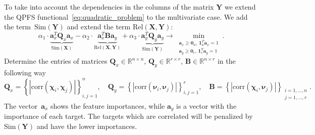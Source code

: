 \documentclass[12pt,twoside]{article}
\newcommand{\ba}{\mathbf{a}}
\newcommand{\bY}{\mathbf{Y}}
\newcommand{\bX}{\mathbf{X}}
\newcommand{\bB}{\mathbf{B}}
\newcommand{\bQ}{\mathbf{Q}}
\newcommand{\bbR}{\mathbb{R}}
\newcommand{\bchi}{\boldsymbol{\chi}}
\newcommand{\bnu}{\boldsymbol{\nu}}
\newcommand{\bOne}{\boldsymbol{1}}
\newcommand{\bZero}{\boldsymbol{0}}
\begin{document}
To take into account the dependencies in the columns of the matrix $\bY$ we extend the QPFS functional~\eqref{eq:quadratic_problem} to the multivariate case.
We add the term~$\text{Sim}(\bY)$ and extend the term $\text{Rel}(\bX, \bY)$:
\begin{equation}
	\alpha_1 \cdot \underbrace{\ba_x^T \bQ_x \ba_x}_{\text{Sim}(\bX)} - \alpha_2 \cdot \underbrace{\ba_x^T \bB \ba_y}_{\text{Rel}(\bX, \bY)} + \alpha_3 \cdot \underbrace{\ba_y^T \bQ_y \ba_y}_{\text{Sim}(\bY)} \rightarrow \min_{\substack{\ba_x \geq \bZero_n, \, \bOne_n^T\ba_x=1 \\ \ba_y \geq \bZero_r, \, \bOne_r^T\ba_y=1}}.
	\label{eq:multivariate_quadratic_problem}
\end{equation}
Determine the entries of matrices $\bQ_x \in \bbR^{n \times n}$, $\bQ_y \in \bbR^{r \times r}$, $\bB \in \bbR^{n \times r}$ in the following way
\begin{equation*}
	\bQ_x = \left\{ \left| \text{corr}(\bchi_i, \bchi_j) \right| \right\}_{i,j=1}^n, \quad
	\bQ_y = \left\{ \left| \text{corr}(\bnu_i, \bnu_j) \right| \right\}_{i,j=1}^r, \quad
	\bB =  \left\{ \left| \text{corr}(\bchi_i, \bnu_j) \right| \right\}_{\substack{i=1, \dots, n \\ j=1, \dots, r}}.
\end{equation*}
The vector~$\ba_x$ shows the feature importances, while $\ba_y$ is a vector with the importance of each target.
The targets which are correlated will be penalized by $\text{Sim} (\bY)$ and have the lower importances.
\end{document}
